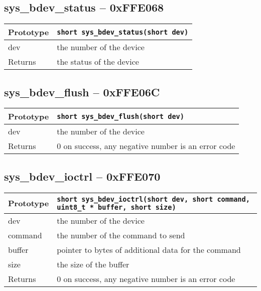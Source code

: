 \subsection*{sys\_bdev\_status -- 0xFFE068}
\begin{tabular}{|l||l|} \hline
Prototype & \lstinline!short sys_bdev_status(short dev)! \\ \hline
dev & the number of the device \\ \hline
Returns & the status of the device \\ \hline
\end{tabular}

\subsection*{sys\_bdev\_flush -- 0xFFE06C}
\begin{tabular}{|l||l|} \hline
Prototype & \lstinline!short sys_bdev_flush(short dev)! \\ \hline
dev & the number of the device \\ \hline
Returns & 0 on success, any negative number is an error code \\ \hline
\end{tabular}

\subsection*{sys\_bdev\_ioctrl -- 0xFFE070}
\begin{tabular}{|l||l|} \hline
Prototype & \lstinline!short sys_bdev_ioctrl(short dev, short command, uint8_t * buffer, short size)! \\ \hline
dev & the number of the device \\ \hline
command & the number of the command to send \\ \hline
buffer & pointer to bytes of additional data for the command \\ \hline
size & the size of the buffer \\ \hline
Returns & 0 on success, any negative number is an error code \\ \hline
\end{tabular}
